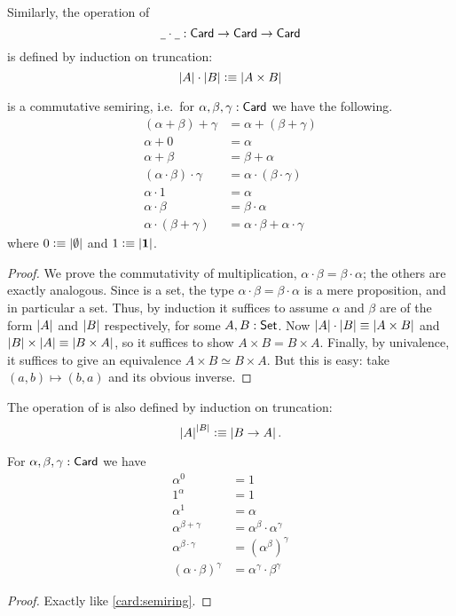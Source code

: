 \begin{defn}
  Similarly, the operation of 
  \[ \mathord{\underline{\hspace{1ex}}}\cdot\mathord{\underline{\hspace{1ex}}} : \mathsf{Card} \to \mathsf{Card} \to \mathsf{Card} \]
  is defined by induction on truncation:
  \[ \left|A\right| \cdot \left|B\right| \vcentcolon\equiv \left|A\times B\right| \]
\end{defn}

\begin{lem}\label{card:semiring}
  \card is a commutative semiring, i.e.\ for $\alpha,\beta,\gamma:\mathsf{Card}$ we have the following.
  \begin{align*}
    (\alpha+\beta)+\gamma &= \alpha+(\beta+\gamma)\\
    \alpha+0 &= \alpha\\
    \alpha + \beta &= \beta + \alpha\\
    (\alpha \cdot \beta) \cdot \gamma &= \alpha \cdot (\beta\cdot\gamma)\\
    \alpha \cdot 1 &= \alpha\\
    \alpha\cdot\beta &= \beta\cdot\alpha\\
    \alpha\cdot(\beta+\gamma) &= \alpha\cdot\beta + \alpha\cdot\gamma
  \end{align*}
  where $0 \vcentcolon\equiv \left|\emptyset\right|$ and $1\vcentcolon\equiv\left|\mathbf{1}\right|$.
\end{lem}
\begin{proof}
  We prove the commutativity of multiplication, $\alpha\cdot\beta = \beta\cdot\alpha$; the others are exactly analogous.
  Since \card is a set, the type $\alpha\cdot\beta = \beta\cdot\alpha$ is a mere proposition, and in particular a set.
  Thus, by induction it suffices to assume $\alpha$ and $\beta$ are of the form $\left|A\right|$ and $\left|B\right|$ respectively, for some $A,B:\mathsf{Set}$.
  Now $\left|A\right|\cdot \left|B\right| \equiv \left|A\times B\right|$ and $\left|B\right|\times\left|A\right| \equiv \left|B\times A\right|$, so it suffices to show $A\times B = B\times A$.
  Finally, by univalence, it suffices to give an equivalence $A\times B \simeq B\times A$.
  But this is easy: take $(a,b) \mapsto (b,a)$ and its obvious inverse.
\end{proof}

\begin{defn}
  The operation of  is also defined by induction on truncation:
  \[ \left|A\right|^{\left|B\right|} \vcentcolon\equiv \left|B\to A\right|. \]
\end{defn}

\begin{lem}\label{card:exp}
  For $\alpha,\beta,\gamma:\mathsf{Card}$ we have
  \begin{align*}
    \alpha^0 &= 1\\
    1^\alpha &= 1\\
    \alpha^1 &= \alpha\\
    \alpha^{\beta+\gamma} &= \alpha^\beta \cdot \alpha^\gamma\\
    \alpha^{\beta\cdot \gamma} &= (\alpha^{\beta})^\gamma\\
    (\alpha\cdot\beta)^\gamma &= \alpha^\gamma \cdot \beta^\gamma
  \end{align*}
\end{lem}
\begin{proof}
  Exactly like \autoref{card:semiring}.
\end{proof}

